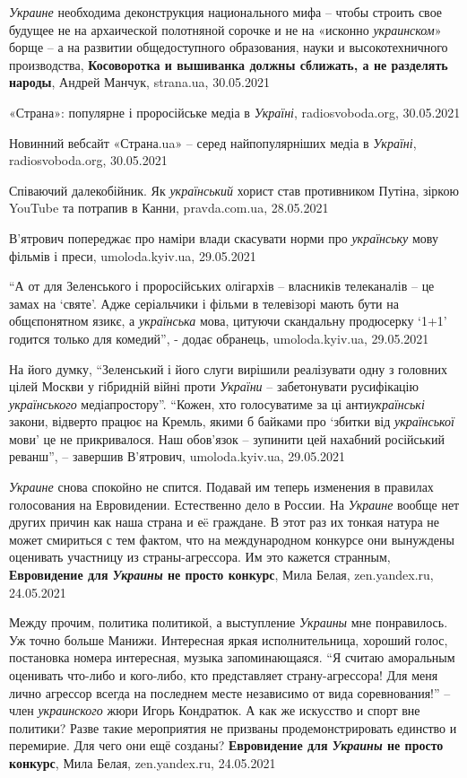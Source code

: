 \emph{Украине} необходима деконструкция национального мифа – чтобы строить свое
будущее не на архаической полотняной сорочке и не на «исконно
\emph{украинском}» борще – а на развитии общедоступного образования, науки и
высокотехничного производства, \textbf{Косоворотка и вышиванка должны сближать,
а не разделять народы}, Андрей Манчук, strana.ua, 30.05.2021

«Страна»: популярне і проросійське медіа в \emph{Україні}, radiosvoboda.org,
30.05.2021

Новинний вебсайт «Страна.ua» – серед найпопулярніших медіа в \emph{Україні},
radiosvoboda.org, 30.05.2021

Співаючий далекобійник. Як \emph{український} хорист став противником Путіна,
зіркою YouTube та потрапив в Канни, pravda.com.ua, 28.05.2021

В'ятрович попереджає про наміри влади скасувати норми про \emph{українську} мову
фільмів і преси, umoloda.kyiv.ua, 29.05.2021

\enquote{А от для Зеленського і проросійських олігархів – власників телеканалів
– це замах на \enquote{святе}. Адже серіальчики і фільми в телевізорі мають
бути на общєпонятном язикє, а \emph{українська} мова, цитуючи скандальну
продюсерку \enquote{1+1} годится только для комедий}, - додає обранець,
umoloda.kyiv.ua, 29.05.2021

На його думку, \enquote{Зеленський і його слуги вирішили реалізувати одну з
головних цілей Москви у гібридній війні проти \emph{України} – забетонувати
русифікацію \emph{українського} медіапростору}.  \enquote{Кожен, хто голосуватиме за
ці анти\emph{українські} закони, відверто працює на Кремль, якими б байками про
\enquote{збитки від \emph{української} мови} це не прикривалося. Наш обов'язок –
зупинити цей нахабний російський реванш}, – завершив В'ятрович,
umoloda.kyiv.ua, 29.05.2021

\emph{Украине} снова спокойно не спится. Подавай им теперь изменения в правилах
голосования на Евровидении. Естественно дело в России. На \emph{Украине}
вообще нет других причин как наша страна и еë граждане.  В этот раз их тонкая
натура не может смириться с тем фактом, что на международном конкурсе они
вынуждены оценивать участницу из страны-агрессора. Им это кажется странным,
\textbf{Евровидение для \emph{Украины} не просто конкурс}, Мила Белая,
zen.yandex.ru, 24.05.2021

Между прочим, политика политикой, а выступление \emph{Украины} мне понравилось.
Уж точно больше Манижи. Интересная яркая исполнительница, хороший голос,
постановка номера интересная, музыка запоминающаяся.  \enquote{Я считаю
аморальным оценивать что-либо и кого-либо, кто представляет страну-агрессора!
Для меня лично агрессор всегда на последнем месте независимо от вида
соревнования!} – член \emph{украинского} жюри Игорь Кондратюк. А как же
искусство и спорт вне политики? Разве такие мероприятия не призваны
продемонстрировать единство и перемирие. Для чего они ещё созданы?
\textbf{Евровидение для \emph{Украины} не просто конкурс}, Мила Белая,
zen.yandex.ru, 24.05.2021

